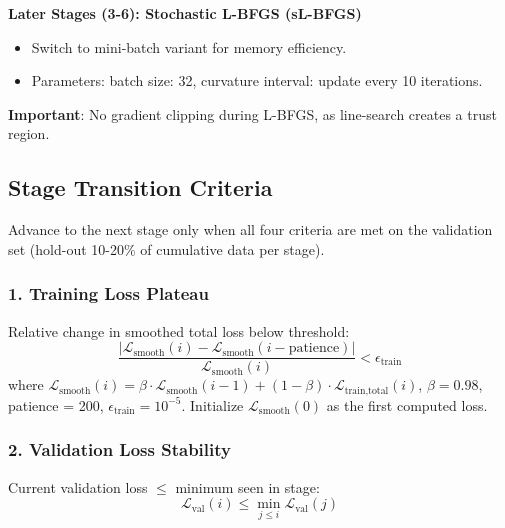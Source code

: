 \textbf{Later Stages (3-6): Stochastic L-BFGS (sL-BFGS)}
\begin{itemize}
    \item Switch to mini-batch variant for memory efficiency.
    \item Parameters: batch size: 32, curvature interval: update every 10 iterations.
\end{itemize}
\textbf{Important}: No gradient clipping during L-BFGS, as line-search creates a trust region.

\subsection{Stage Transition Criteria}


Advance to the next stage only when all four criteria are met on the validation set (hold-out 10-20\% of cumulative data per stage).

\subsubsection{1. Training Loss Plateau}
Relative change in smoothed total loss below threshold:
\begin{equation}
\frac{|\mathcal{L}_{\text{smooth}}(i) - \mathcal{L}_{\text{smooth}}(i - \text{patience})|}{\mathcal{L}_{\text{smooth}}(i)} < \epsilon_{\text{train}}
\end{equation}
where $\mathcal{L}_{\text{smooth}}(i) = \beta \cdot \mathcal{L}_{\text{smooth}}(i-1) + (1-\beta) \cdot \mathcal{L}_{\text{train,total}}(i)$, $\beta = 0.98$, patience = 200, $\epsilon_{\text{train}} = 10^{-5}$. Initialize $\mathcal{L}_{\text{smooth}}(0)$ as the first computed loss.

\subsubsection{2. Validation Loss Stability}
Current validation loss $\leq$ minimum seen in stage:
\begin{equation}
\mathcal{L}_{\text{val}}(i) \leq \min_{j \leq i} \mathcal{L}_{\text{val}}(j)
\end{equation}

